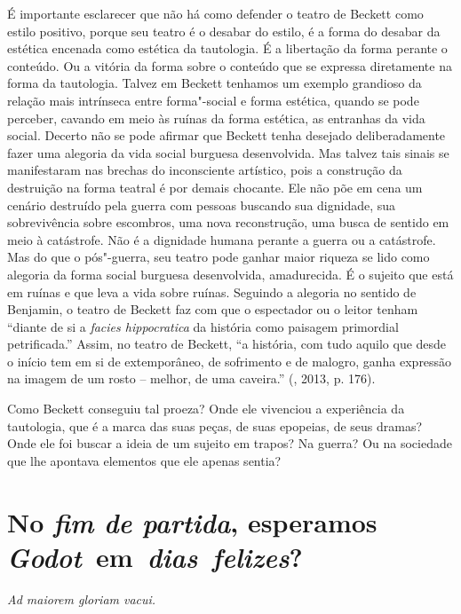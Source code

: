 {É importante esclarecer que não há como defender o teatro de Beckett
como estilo positivo, porque seu teatro é o desabar do estilo, é a forma
do desabar da estética encenada como estética da tautologia. É a
libertação da forma perante o conteúdo. Ou a vitória da forma sobre o
conteúdo que se expressa diretamente na forma da tautologia. Talvez em
Beckett tenhamos um exemplo grandioso da relação mais intrínseca entre
forma"-social e forma estética, quando se pode perceber, cavando em meio
às ruínas da forma estética, as entranhas da vida social. Decerto não se
pode afirmar que Beckett tenha desejado deliberadamente fazer uma
alegoria da vida social burguesa desenvolvida. Mas talvez tais sinais se
manifestaram nas brechas do inconsciente artístico, pois a construção da
destruição na forma teatral é por demais chocante. Ele não põe em cena
um cenário destruído pela guerra com pessoas buscando sua dignidade, sua
sobrevivência sobre escombros, uma nova reconstrução, uma busca de
sentido em meio à catástrofe. Não é a dignidade humana perante a guerra
ou a catástrofe. Mas do que o pós"-guerra, seu teatro pode ganhar maior
riqueza se lido como alegoria da forma social burguesa desenvolvida,
amadurecida. É o sujeito que está em ruínas e que leva a vida sobre
ruínas. Seguindo a alegoria no sentido de Benjamin, o teatro de Beckett
faz com que o espectador ou o leitor tenham ``diante de si a
\emph{facies hippocratica} da história como paisagem primordial
petrificada.'' Assim, no teatro de Beckett, ``a história, com tudo
aquilo que desde o início tem em si de extemporâneo, de sofrimento e de
malogro, ganha expressão na imagem de um rosto -- melhor, de uma
caveira.'' (, 2013, p. 176).

Como Beckett conseguiu tal proeza? Onde ele vivenciou a experiência da
tautologia, que é a marca das suas peças, de suas epopeias, de seus
dramas? Onde ele foi buscar a ideia de um sujeito em trapos? Na guerra?
Ou na sociedade que lhe apontava elementos que ele apenas sentia?

\pagebreak

\section*{No \emph{fim de partida}, esperamos \emph{Godot}~em~\emph{dias~felizes}?}

\begin{flushright}
\scriptsize{\emph{Ad maiorem gloriam vacui.}}
\end{flushright}

}
